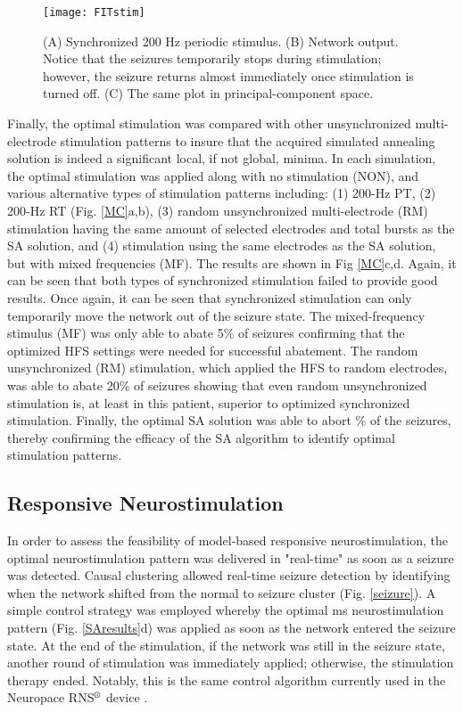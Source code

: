 \documentclass[11pt,a4paper,final]{article}
\begin{document}
\begin{figure}[!ht]
	\centering
	\texttt{[image: FITstim]}
	\caption[Periodic Stimulation]{
		(A) Synchronized 200 Hz periodic stimulus.
		(B) Network output. Notice that the seizures temporarily stops during stimulation; however, the seizure returns almost immediately once stimulation is turned off.
		(C) The same plot in principal-component space.}
	\label{FITstim}
\end{figure}

Finally, the optimal stimulation was compared with other unsynchronized multi-electrode stimulation patterns to insure that the acquired simulated annealing solution is indeed a significant local, if not global, minima.
In each simulation, the optimal stimulation was applied along with no stimulation (NON), and various alternative types of stimulation patterns including:
(1) 200-Hz PT,
(2) 200-Hz RT (Fig. \ref{MC}a,b),
(3) random unsynchronized multi-electrode (RM) stimulation having the same amount of selected electrodes and total bursts as the SA solution, and
(4) stimulation using the same electrodes as the SA solution, but with mixed frequencies (MF).
The results are shown in Fig \ref{MC}c,d.
Again, it can be seen that both types of synchronized stimulation failed to provide good results.
Once again, it can be seen that synchronized stimulation can only  temporarily move the network out of the seizure state.
The mixed-frequency stimulus (MF) was only able to abate 5\% of seizures confirming that the optimized HFS settings were needed for successful abatement.
The random unsynchronized (RM) stimulation, which applied the HFS to random electrodes, was able to abate 20\% of seizures showing that even random unsynchronized stimulation is, at least in this patient, superior to optimized synchronized stimulation.
Finally, the optimal SA solution was able to abort \success{}\% of the seizures, thereby confirming the efficacy of the SA algorithm to identify optimal stimulation patterns.

    \subsection{Responsive Neurostimulation}

In order to assess the feasibility of model-based responsive neurostimulation, the optimal neurostimulation pattern was delivered in "real-time" as soon as a seizure was detected.
Causal clustering allowed real-time seizure detection by identifying when the network shifted from the normal to seizure cluster (Fig. \ref{seizure}).
A simple control strategy was employed whereby the optimal \len{} ms neurostimulation pattern (Fig. \ref{SAresults}d) was applied as soon as the network entered the seizure state.
At the end of the stimulation, if the network was still in the seizure state, another round of stimulation was immediately applied; otherwise, the stimulation therapy ended.
Notably, this is the same control algorithm currently used in the Neuropace RNS$\textsuperscript{\textregistered}$ device \citep{NP}.
\end{document}
